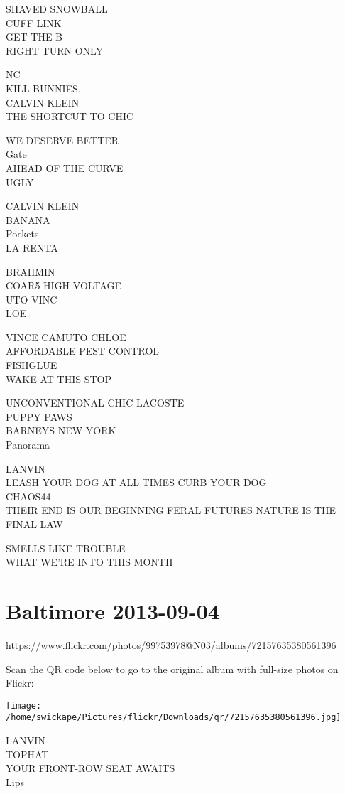 \documentclass[10pt,letterpaper]{article}
\begin{document}
SHAVED SNOWBALL\\
CUFF LINK\\
GET THE B\\
RIGHT TURN ONLY

NC\\
KILL BUNNIES.\\
CALVIN KLEIN\\
THE SHORTCUT TO CHIC

WE DESERVE BETTER\\
Gate\\
AHEAD OF THE CURVE\\
UGLY

CALVIN KLEIN\\
BANANA\\
Pockets\\
LA RENTA

BRAHMIN\\
COAR5 HIGH VOLTAGE\\
UTO VINC\\
LOE

VINCE CAMUTO CHLOE\\
AFFORDABLE PEST CONTROL\\
FISHGLUE\\
WAKE AT THIS STOP

UNCONVENTIONAL CHIC LACOSTE\\
PUPPY PAWS\\
BARNEYS NEW YORK\\
Panorama

LANVIN\\
LEASH YOUR DOG AT ALL TIMES CURB YOUR DOG\\
CHAOS44\\
THEIR END IS OUR BEGINNING FERAL FUTURES NATURE IS THE FINAL LAW

SMELLS LIKE TROUBLE\\
WHAT WE'RE INTO THIS MONTH


\section*{Baltimore 2013-09-04}

\url{https://www.flickr.com/photos/99753978@N03/albums/72157635380561396}

Scan the QR code below to go to the original album with full-size photos on Flickr:

\texttt{[image: /home/swickape/Pictures/flickr/Downloads/qr/72157635380561396.jpg]}


LANVIN\\
TOPHAT\\
YOUR FRONT{-}ROW SEAT AWAITS\\
Lips
\end{document}
